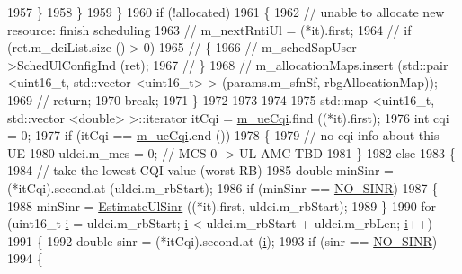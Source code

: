 \begin{DoxyCode}
1957                 \}
1958             \}
1959         \}
1960       \textcolor{keywordflow}{if} (!allocated)
1961         \{
1962           \textcolor{comment}{// unable to allocate new resource: finish scheduling}
1963 \textcolor{comment}{//          m\_nextRntiUl = (*it).first;}
1964 \textcolor{comment}{//          if (ret.m\_dciList.size () > 0)}
1965 \textcolor{comment}{//            \{}
1966 \textcolor{comment}{//              m\_schedSapUser->SchedUlConfigInd (ret);}
1967 \textcolor{comment}{//            \}}
1968 \textcolor{comment}{//          m\_allocationMaps.insert (std::pair <uint16\_t, std::vector <uint16\_t> > (params.m\_sfnSf,
       rbgAllocationMap));}
1969 \textcolor{comment}{//          return;}
1970           \textcolor{keywordflow}{break};
1971         \}
1972 
1973 
1974 
1975       std::map <uint16\_t, std::vector <double> >::iterator itCqi = \hyperlink{classns3_1_1FdTbfqFfMacScheduler_a74c33465af3fd4306d994e9942836a27}{m\_ueCqi}.find ((*it).first);
1976       \textcolor{keywordtype}{int} cqi = 0;
1977       \textcolor{keywordflow}{if} (itCqi == \hyperlink{classns3_1_1FdTbfqFfMacScheduler_a74c33465af3fd4306d994e9942836a27}{m\_ueCqi}.end ())
1978         \{
1979           \textcolor{comment}{// no cqi info about this UE}
1980           uldci.m\_mcs = 0; \textcolor{comment}{// MCS 0 -> UL-AMC TBD}
1981         \}
1982       \textcolor{keywordflow}{else}
1983         \{
1984           \textcolor{comment}{// take the lowest CQI value (worst RB)}
1985           \textcolor{keywordtype}{double} minSinr = (*itCqi).second.at (uldci.m\_rbStart);
1986           \textcolor{keywordflow}{if} (minSinr == \hyperlink{cqa-ff-mac-scheduler_8h_a520d71777be043568160c783a9c65fd5}{NO\_SINR})
1987             \{
1988               minSinr = \hyperlink{classns3_1_1FdTbfqFfMacScheduler_a796f3c39b9129b67c429d9d122525ae0}{EstimateUlSinr} ((*it).first, uldci.m\_rbStart);
1989             \}
1990           \textcolor{keywordflow}{for} (uint16\_t \hyperlink{bernuolliDistribution_8m_a6f6ccfcf58b31cb6412107d9d5281426}{i} = uldci.m\_rbStart; \hyperlink{bernuolliDistribution_8m_a6f6ccfcf58b31cb6412107d9d5281426}{i} < uldci.m\_rbStart + uldci.m\_rbLen; 
      \hyperlink{bernuolliDistribution_8m_a6f6ccfcf58b31cb6412107d9d5281426}{i}++)
1991             \{
1992               \textcolor{keywordtype}{double} sinr = (*itCqi).second.at (\hyperlink{bernuolliDistribution_8m_a6f6ccfcf58b31cb6412107d9d5281426}{i});
1993               \textcolor{keywordflow}{if} (sinr == \hyperlink{cqa-ff-mac-scheduler_8h_a520d71777be043568160c783a9c65fd5}{NO\_SINR})
1994                 \{

\end{DoxyCode}
